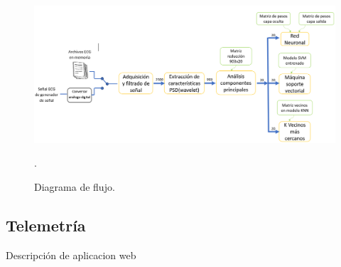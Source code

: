 \documentclass[journal]{IEEEtran}
\begin{document}
\begin{figure}[!t]
	\centering
	\includegraphics[width=6.5in]{diagrama_bloques_adc}%
	
	\hfil
	
	\caption{Diagrama de flujo.}.
	\label{diagrama_bloques}
\end{figure}


\subsection{Telemetría}
Descripción de aplicacion web






\end{document}

